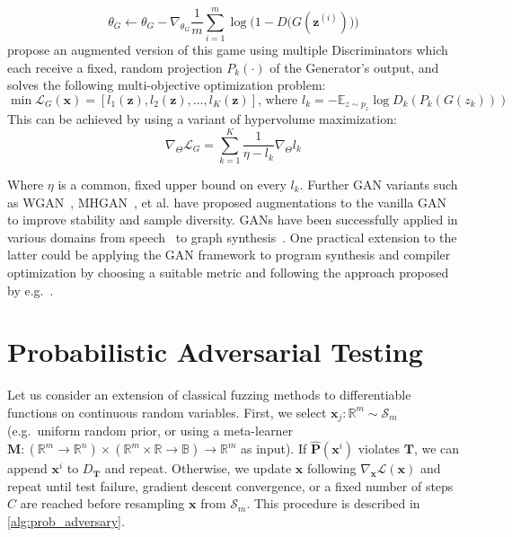 \begin{equation}
\theta_G \leftarrow \theta_G - \nabla_{\theta_G}\frac{1}{m}\sum_{i=1}^m \log\Big(1 - D\big(G(\mathbf z^{(i)})\big)\Big)
\end{equation}
%
\citet{albuquerque2019hgan} propose an augmented version of this game using multiple Discriminators which each receive a fixed, random projection $P_k(\cdot)$ of the Generator's output, and solves the following multi-objective optimization problem:
%
\begin{equation} \label{eq:moo_spec}
\min \mathbf{\mathcal{L}}_G(\mathbf x) = \left[l_1(\mathbf z), l_2(\mathbf z), \ldots, l_K(\mathbf z)\right] \text{, where } l_k = -\mathbb E_{z \sim p_z} \log D_k(P_k(G(z_k)))
\end{equation}
%
This can be achieved by using a variant of hypervolume maximization:
%
\begin{equation}
\nabla_\Theta \mathcal{L}_G = \sum_{k=1}^K \frac{1}{\eta - l_k}\nabla_\Theta l_k
\end{equation}

Where $\eta$ is a common, fixed upper bound on every $l_k$. Further GAN variants such as WGAN~\citep{arjovsky2017wgan}, MHGAN~\citep{turner2019mhgan}, et al. have proposed augmentations to the vanilla GAN to improve stability and sample diversity. GANs have been successfully applied in various domains from speech~\citep{donahue2019wavegan} to graph synthesis~\citep{wang2018graphgan}. One practical extension to the latter could be applying the GAN framework to program synthesis and compiler optimization by choosing a suitable metric and following the approach proposed by e.g.~\citet{adams2019learning, mendis2019compiler}.
%
\section{Probabilistic Adversarial Testing}\label{sec:prob_ad_test}

%

Let us consider an extension of classical fuzzing methods to differentiable functions on continuous random variables. First, we select $\mathbf{x}_j: \mathbb{R}^m \sim \mathcal S_m$ (e.g.\ uniform random prior, or using a meta-learner $\mathbf M: (\mathbb{R}^m \rightarrow \mathbb{R}^n) \times (\mathbb{R}^m \times \mathbb R \rightarrow \mathbb B) \rightarrow \mathbb{R}^m$ as input). If $\mathbf{\hat P}(\mathbf{x}^i)$ violates $\mathbf T$, we can append $\mathbf x^i$ to $D_\mathbf T$ and repeat. Otherwise, we update $\mathbf x$ following $\nabla_{\mathbf x}\mathcal{L}(\mathbf{x})$ and repeat until test failure, gradient descent convergence, or a fixed number of steps $C$ are reached before resampling $\mathbf{x}$ from $\mathcal S_m$. This procedure is described in \autoref{alg:prob_adversary}.

